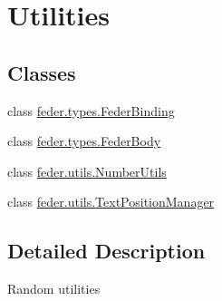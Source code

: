 \hypertarget{group__utils}{}\section{Utilities}
\label{group__utils}
\subsection*{Classes}
\begin{DoxyCompactItemize}
\item 
class \hyperlink{classfeder_1_1types_1_1FederBinding}{feder.\+types.\+Feder\+Binding}
\item 
class \hyperlink{classfeder_1_1types_1_1FederBody}{feder.\+types.\+Feder\+Body}
\item 
class \hyperlink{classfeder_1_1utils_1_1NumberUtils}{feder.\+utils.\+Number\+Utils}
\item 
class \hyperlink{classfeder_1_1utils_1_1TextPositionManager}{feder.\+utils.\+Text\+Position\+Manager}
\end{DoxyCompactItemize}


\subsection{Detailed Description}
Random utilities 